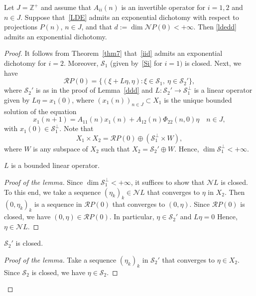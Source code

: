 \documentclass[10pt,a4paper]{amsart}
\begin{document}
\begin{theorem}\label{515thm}
Let $J=\mathbb Z^+$ and assume that $A_{ii}(n)$ is an invertible operator for $i=1, 2$ and $n\in J$. Suppose that~\eqref{LDE} admits an exponential dichotomy with respect to projections $P(n)$, $n\in J$, and that $d:=\dim \mathcal NP(0)<+\infty$. Then \eqref{ldedd} admits an exponential dichotomy.

\end{theorem}

\begin{proof}
It follows from Theorem~\ref{thm7} that~\eqref{iid} admits an exponential dichotomy for $i=2$. Moreover, $\mathcal S_1$ (given by~\eqref{Si} for $i=1)$ is closed. 
Next, we have
\[
\mathcal R P(0)=\{(\xi+L\eta, \eta): \xi \in \mathcal S_1, \ \eta \in \mathcal S_2'\},
\]
where $\mathcal S_2'$ is as in the proof of Lemma~\ref{ddd} and $L\colon \mathcal S_2'\to \mathcal S_1^\perp$ is a linear operator given by $L\eta=x_1(0)$, where $(x_1(n))_{n\in J}\subset X_1$ is the unique bounded solution of the equation
\[
x_1(n+1)=A_{11}(n)x_1(n)+A_{12}(n)\Phi_{22}(n, 0)\eta \quad n\in J,
\]
with $x_1(0)\in \mathcal S_1^\perp$. Note that 
\[
X_1\times X_2=\mathcal RP(0)\oplus (\mathcal S_1^\perp \times W),
\]
where $W$ is any subspace of $X_2$ such that $X_2=\mathcal S_2'\oplus W$. Hence, $\dim \mathcal S_1^\perp<+\infty$.
\begin{lemma}\label{bounded}
$L$ is a bounded linear operator.
\end{lemma}

\begin{proof}[Proof of the lemma]
Since $\dim \mathcal S_1^\perp<+\infty$, it suffices to show that $\mathcal N L$ is closed. To this end, we take a sequence $(\eta_k)_k \in \mathcal N L$ that converges to $\eta$ in $X_2$. Then $(0, \eta_k)_k$ is a sequence in $\mathcal RP(0)$ that converges to $(0, \eta)$. Since $\mathcal RP(0)$ is closed, we have $(0, \eta)\in \mathcal R P(0)$. In particular, $\eta \in \mathcal S_2'$ and $L\eta=0$
Hence, $\eta \in \mathcal N L$.
\end{proof}
\begin{lemma}\label{closed}
$\mathcal S_2'$ is closed.
\end{lemma}

\begin{proof}[Proof of the lemma]
Take a sequence $(\eta_k)_k$ in $\mathcal S_2'$ that converges to $\eta\in X_2$. Since $\mathcal S_2$ is closed, we have $\eta \in \mathcal S_2$.


\end{proof}
\end{proof}
\end{document}
